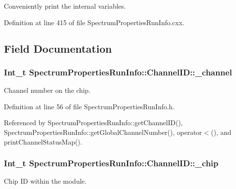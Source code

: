Conveniently print the internal variables. 



Definition at line 415 of file Spectrum\-Properties\-Run\-Info.\-cxx.



\subsection{Field Documentation}
\hypertarget{class_spectrum_properties_run_info_1_1_channel_i_d_a1a17e4dd2a69226553d3727f313cfb20}{
\subsubsection[{\-\_\-channel}]{\setlength{\rightskip}{0pt plus 5cm}Int\-\_\-t Spectrum\-Properties\-Run\-Info\-::\-Channel\-I\-D\-::\-\_\-channel}}\label{class_spectrum_properties_run_info_1_1_channel_i_d_a1a17e4dd2a69226553d3727f313cfb20}


Channel number on the chip. 



Definition at line 56 of file Spectrum\-Properties\-Run\-Info.\-h.



Referenced by Spectrum\-Properties\-Run\-Info\-::get\-Channel\-I\-D(), Spectrum\-Properties\-Run\-Info\-::get\-Global\-Channel\-Number(), operator$<$(), and print\-Channel\-Status\-Map().

\hypertarget{class_spectrum_properties_run_info_1_1_channel_i_d_a4aa4404441ca9ef720a7a1dbcf412aae}{
\subsubsection[{\-\_\-chip}]{\setlength{\rightskip}{0pt plus 5cm}Int\-\_\-t Spectrum\-Properties\-Run\-Info\-::\-Channel\-I\-D\-::\-\_\-chip}}\label{class_spectrum_properties_run_info_1_1_channel_i_d_a4aa4404441ca9ef720a7a1dbcf412aae}


Chip I\-D within the module. 



